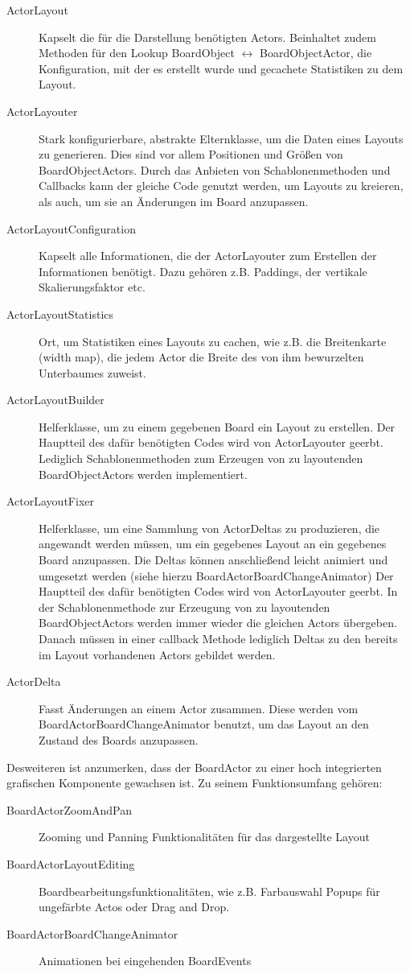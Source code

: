 \begin{description}
\item[ActorLayout]
	Kapselt die für die Darstellung benötigten Actors. 
	Beinhaltet zudem Methoden für den Lookup BoardObject $\leftrightarrow$ BoardObjectActor, die Konfiguration, mit der es erstellt wurde und gecachete Statistiken zu dem Layout.
\item[ActorLayouter]
	Stark konfigurierbare, abstrakte Elternklasse, um die Daten eines Layouts zu generieren.
	Dies sind vor allem Positionen und Größen von BoardObjectActors.
	Durch das Anbieten von Schablonenmethoden und Callbacks kann der gleiche Code genutzt werden, um Layouts zu kreieren, als auch, um sie an Änderungen im Board anzupassen.
\item[ActorLayoutConfiguration]
	Kapselt alle Informationen, die der ActorLayouter zum Erstellen der Informationen benötigt. Dazu gehören z.B. Paddings, der vertikale Skalierungsfaktor etc.
\item[ActorLayoutStatistics]
	Ort, um Statistiken eines Layouts zu cachen, wie z.B. die Breitenkarte (width map), die jedem Actor die Breite des von ihm bewurzelten Unterbaumes zuweist.
\item[ActorLayoutBuilder]
	Helferklasse, um zu einem gegebenen Board ein Layout zu erstellen.
	Der Hauptteil des dafür benötigten Codes wird von ActorLayouter geerbt.
	Lediglich Schablonenmethoden zum Erzeugen von zu layoutenden BoardObjectActors werden implementiert.
\item[ActorLayoutFixer]
	Helferklasse, um eine Sammlung von ActorDeltas zu produzieren, die angewandt werden müssen, um ein gegebenes Layout an ein gegebenes Board anzupassen.
	Die Deltas können anschließend leicht animiert und umgesetzt werden (siehe hierzu BoardActorBoardChangeAnimator)
	Der Hauptteil des dafür benötigten Codes wird von ActorLayouter geerbt.
	In der Schablonenmethode zur Erzeugung von zu layoutenden BoardObjectActors werden immer wieder die gleichen Actors übergeben.
	Danach müssen in einer callback Methode lediglich Deltas zu den bereits im Layout vorhandenen Actors gebildet werden.
\item[ActorDelta]
	Fasst Änderungen an einem Actor zusammen.
	Diese werden vom BoardActorBoardChangeAnimator benutzt, um das Layout an den Zustand des Boards anzupassen.
\end{description}

Desweiteren ist anzumerken, dass der BoardActor zu einer hoch integrierten grafischen Komponente gewachsen ist.
Zu seinem Funktionsumfang gehören:
\begin{description}
\item[BoardActorZoomAndPan] 
	Zooming und Panning Funktionalitäten für das dargestellte Layout
\item[BoardActorLayoutEditing] 
	Boardbearbeitungsfunktionalitäten, wie z.B. Farbauswahl Popups für ungefärbte Actos oder Drag and Drop.
\item[BoardActorBoardChangeAnimator] 
	Animationen bei eingehenden BoardEvents
\end{description}


